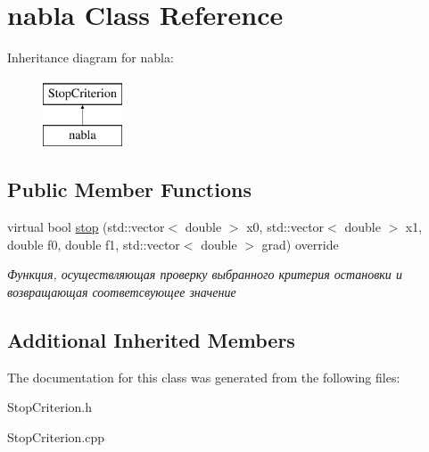 \hypertarget{classnabla}{}\section{nabla Class Reference}
\label{classnabla}
Inheritance diagram for nabla\+:\begin{figure}[H]
\begin{center}
\leavevmode
\includegraphics[height=2.000000cm]{classnabla}
\end{center}
\end{figure}
\subsection*{Public Member Functions}
\begin{DoxyCompactItemize}
\item 
\mbox{\label{classnabla_a9c946427a24ea077555876ed4f0ecbea}} 
virtual bool \mbox{\hyperlink{classnabla_a9c946427a24ea077555876ed4f0ecbea}{stop}} (std\+::vector$<$ double $>$ x0, std\+::vector$<$ double $>$ x1, double f0, double f1, std\+::vector$<$ double $>$ grad) override
\begin{DoxyCompactList}\small\item\em Функция, осуществляющая проверку выбранного критерия остановки и возвращающая соответсвующее значение \end{DoxyCompactList}\end{DoxyCompactItemize}
\subsection*{Additional Inherited Members}


The documentation for this class was generated from the following files\+:\begin{DoxyCompactItemize}
\item 
Stop\+Criterion.\+h\item 
Stop\+Criterion.\+cpp\end{DoxyCompactItemize}
